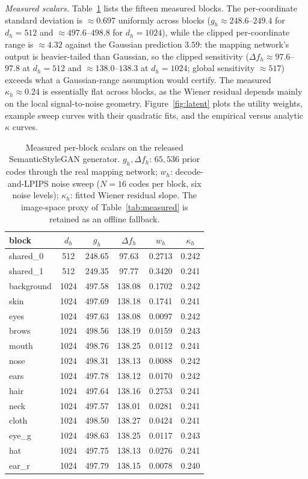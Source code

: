 \documentclass{ieeetj}
\theoremstyle{plain}
\theoremstyle{definition}
\begin{document}
\emph{Measured scalars.} Table~\ref{tab:latent_scalars} lists the fifteen
measured blocks. The per-coordinate standard deviation is $\approx0.697$
uniformly across blocks ($g_h\approx248.6$--$249.4$ for $d_h=512$ and
$\approx497.6$--$498.8$ for $d_h=1024$), while the clipped per-coordinate
range is $\approx4.32$ against the Gaussian prediction $3.59$: the mapping
network's output is heavier-tailed than Gaussian, so the clipped sensitivity
($\Delta f_h\approx97.6$--$97.8$ at $d_h=512$ and $\approx138.0$--$138.3$ at
$d_h=1024$; global sensitivity $\approx517$) exceeds what a Gaussian-range
assumption would certify. The measured $\kappa_h\approx0.24$ is essentially
flat across blocks, as the Wiener residual depends mainly on the local
signal-to-noise geometry. Figure~\ref{fig:latent} plots the utility
weights, example sweep curves with their quadratic fits, and the empirical
versus analytic $\kappa$ curves.

\begin{table}[t]
\centering\footnotesize
\setlength{\tabcolsep}{3.5pt}
\caption{Measured per-block scalars on the released SemanticStyleGAN
generator. $g_h,\Delta f_h$: $65{,}536$ prior codes through the real mapping
network; $w_h$: decode-and-LPIPS noise sweep ($N{=}16$ codes per block, six
noise levels); $\kappa_h$: fitted Wiener residual slope. The image-space
proxy of Table~\ref{tab:measured} is retained as an offline fallback.}
\label{tab:latent_scalars}
\begin{tabular}{lccccc}
\toprule
block & $d_h$ & $g_h$ & $\Delta f_h$ & $w_h$ & $\kappa_h$ \\
\midrule
shared\_0  & 512  & 248.65 & 97.63  & 0.2713 & 0.242 \\
shared\_1  & 512  & 249.35 & 97.77  & 0.3420 & 0.241 \\
background & 1024 & 497.58 & 138.08 & 0.1702 & 0.242 \\
skin       & 1024 & 497.69 & 138.18 & 0.1741 & 0.241 \\
eyes       & 1024 & 497.63 & 138.08 & 0.0097 & 0.242 \\
brows      & 1024 & 498.56 & 138.19 & 0.0159 & 0.243 \\
mouth      & 1024 & 498.76 & 138.25 & 0.0112 & 0.241 \\
nose       & 1024 & 498.31 & 138.13 & 0.0088 & 0.242 \\
ears       & 1024 & 497.78 & 138.12 & 0.0170 & 0.242 \\
hair       & 1024 & 497.64 & 138.16 & 0.2753 & 0.241 \\
neck       & 1024 & 497.57 & 138.01 & 0.0281 & 0.241 \\
cloth      & 1024 & 498.50 & 138.27 & 0.0424 & 0.241 \\
eye\_g     & 1024 & 498.63 & 138.25 & 0.0117 & 0.243 \\
hat        & 1024 & 497.75 & 138.13 & 0.0276 & 0.241 \\
ear\_r     & 1024 & 497.79 & 138.15 & 0.0078 & 0.240 \\
\bottomrule
\end{tabular}
\end{table}
\end{document}
